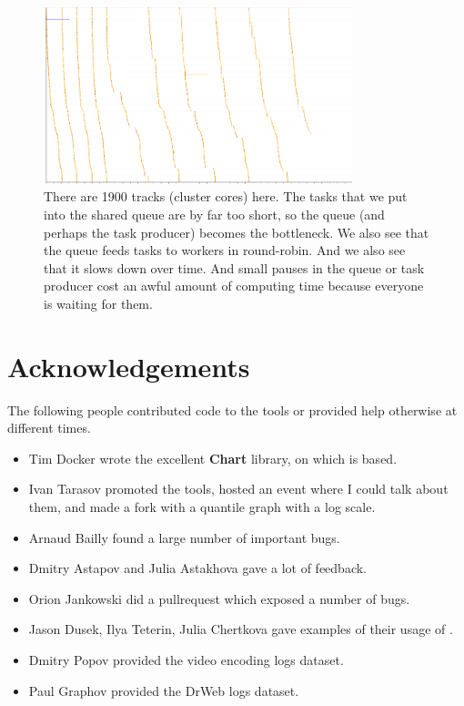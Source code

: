 \documentclass{article}
\begin{document}
\clearpage

\begin{figure}[p]
\center
\includegraphics[width=0.8\textwidth]{pics/splot/spray.png}
\caption{There are 1900 tracks (cluster cores) here. The tasks that we put into the shared queue are by far too short, so the queue (and perhaps the task producer) becomes the bottleneck. We also see that the queue feeds tasks to workers in round-robin. And we also see that it slows down over time. And small pauses in the queue or task producer cost an awful amount of computing time because everyone is waiting for them.}
\label{fig:splot-gallery-last}
\end{figure}

\pagebreak

\section{Acknowledgements}

The following people contributed code to the tools or provided help otherwise at different times.
\begin{itemize}
\item Tim Docker wrote the excellent \textbf{Chart} library, on which \timeplot{} is based.
\item Ivan Tarasov promoted the tools, hosted an event where I could talk about them, and made a fork with a quantile graph with a log scale.
\item Arnaud Bailly found a large number of important bugs.
\item Dmitry Astapov and Julia Astakhova gave a lot of feedback.
\item Orion Jankowski did a pullrequest which exposed a number of bugs.
\item Jason Dusek, Ilya Teterin, Julia Chertkova gave examples of their usage of \timeplot{}.
\item Dmitry Popov provided the video encoding logs dataset.
\item Paul Graphov provided the DrWeb logs dataset.
\end{itemize}
\end{document}

